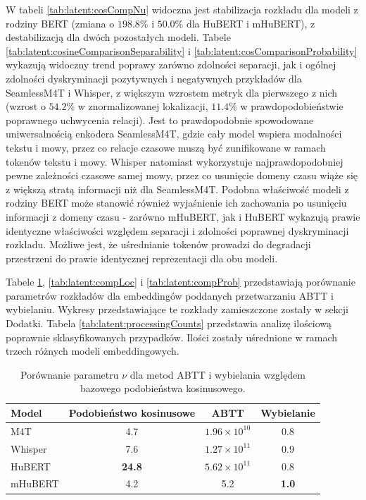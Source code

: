 W tabeli \ref{tab:latent:cosCompNu} widoczna jest stabilizacja rozkładu dla modeli z rodziny BERT (zmiana o $198.8\%$ i $50.0\%$ dla HuBERT i mHuBERT), z destabilizacją dla dwóch pozostałych modeli. Tabele \ref{tab:latent:cosineComparisonSeparability} i \ref{tab:latent:cosComparisonProbability} wykazują widoczny trend poprawy zarówno zdolności separacji, jak i ogólnej zdolności dyskryminacji pozytywnych i negatywnych przykładów dla SeamlessM4T i Whisper, z większym wzrostem metryk dla pierwszego z nich (wzrost o $54.2\%$ w znormalizowanej lokalizacji, $11.4\%$ w prawdopodobieństwie poprawnego uchwycenia relacji). Jest to prawdopodobnie spowodowane uniwersalnością enkodera SeamlessM4T, gdzie cały model wspiera modalności tekstu i mowy, przez co relacje czasowe muszą być zunifikowane w ramach tokenów tekstu i mowy. Whisper natomiast wykorzystuje najprawdopodobniej pewne zależności czasowe samej mowy, przez co usunięcie domeny czasu wiąże się z większą stratą informacji niż dla SeamlessM4T. Podobna właściwość modeli z rodziny BERT może stanowić również wyjaśnienie ich zachowania po usunięciu informacji z domeny czasu - zarówno mHuBERT, jak i HuBERT wykazują prawie identyczne właściwości względem separacji i zdolności poprawnej dyskryminacji rozkładu. Możliwe jest, że uśrednianie tokenów prowadzi do degradacji przestrzeni do prawie identycznej reprezentacji dla obu modeli.



Tabele \ref{tab:latent:compNu}, \ref{tab:latent:compLoc} i \ref{tab:latent:compProb} przedstawiają porównanie parametrów rozkładów dla embeddingów poddanych przetwarzaniu ABTT i wybielaniu. Wykresy przedstawiające te rozkłady zamieszczone zostały w sekcji Dodatki. Tabela \ref{tab:latent:processingCounts} przedstawia analizę ilościową poprawnie sklasyfikowanych przypadków. Ilości zostały uśrednione w ramach trzech różnych modeli embeddingowych.

\begin{table}[h]
\centering
\begin{tabular}{lccc}
\toprule
Model &
Podobieństwo kosinusowe &
ABTT &
Wybielanie \\
\midrule
M4T     & 4.7  & $1.96\times10^{10}$ & 0.8 \\
Whisper & 7.6  & $1.27\times10^{11}$ & 0.9 \\
HuBERT  & \textbf{24.8} & \textbf{$5.62\times10^{11}$} & 0.8 \\
mHuBERT & 4.2  & 5.2                 & \textbf{1.0} \\
\bottomrule
\end{tabular}
\caption{Porównanie parametru $\nu$ dla metod ABTT i wybielania względem bazowego podobieństwa kosinusowego.}
\label{tab:latent:compNu}
\end{table}

